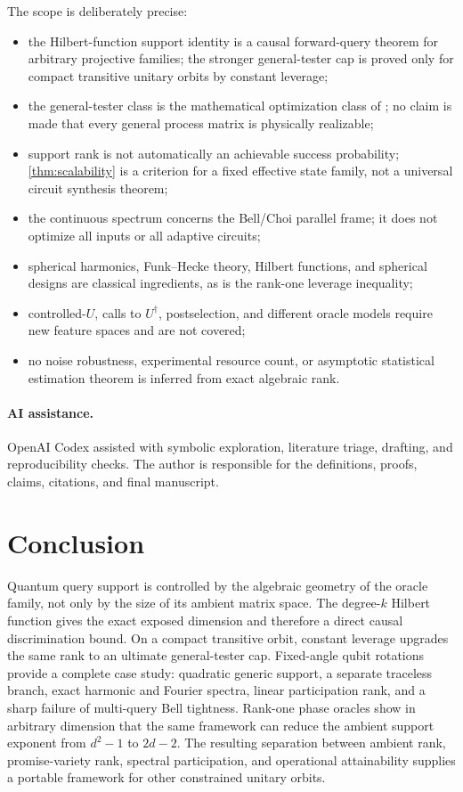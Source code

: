 \documentclass[11pt]{article}
\theoremstyle{definition}
\theoremstyle{remark}
\begin{document}
The scope is deliberately precise:
\begin{itemize}
\item the Hilbert-function support identity is a causal forward-query theorem
for arbitrary projective families; the stronger general-tester cap is proved
only for compact transitive unitary orbits by constant leverage;
\item the general-tester class is the mathematical optimization class of
\cite{bavaresco2022}; no claim is made that every general process matrix is
physically realizable;
\item support rank is not automatically an achievable success probability;
\cref{thm:scalability} is a criterion for a fixed effective state family, not
a universal circuit synthesis theorem;
\item the continuous spectrum concerns the Bell/Choi parallel frame; it does
not optimize all inputs or all adaptive circuits;
\item spherical harmonics, Funk--Hecke theory, Hilbert functions, and
spherical designs are classical ingredients, as is the rank-one leverage
inequality;
\item controlled-$U$, calls to $U^\dagger$, postselection, and different
oracle models require new feature spaces and are not covered;
\item no noise robustness, experimental resource count, or asymptotic
statistical estimation theorem is inferred from exact algebraic rank.
\end{itemize}

\paragraph{AI assistance.}
OpenAI Codex assisted with symbolic exploration, literature triage, drafting,
and reproducibility checks.  The author is responsible for the definitions,
proofs, claims, citations, and final manuscript.

\section{Conclusion}

Quantum query support is controlled by the algebraic geometry of the oracle
family, not only by the size of its ambient matrix space.  The degree-$k$
Hilbert function gives the exact exposed dimension and therefore a direct
causal discrimination bound.  On a compact transitive orbit, constant
leverage upgrades the same rank to an ultimate general-tester cap.
Fixed-angle qubit rotations provide a complete case study: quadratic generic
support, a separate traceless branch, exact harmonic and Fourier spectra,
linear participation rank, and a sharp failure of multi-query Bell
tightness.  Rank-one phase oracles show in arbitrary dimension that the same
framework can reduce the ambient support exponent from $d^2-1$ to $2d-2$.
The resulting separation between ambient rank, promise-variety
rank, spectral participation, and operational attainability supplies a
portable framework for other constrained unitary orbits.

{\small


}
\end{document}

